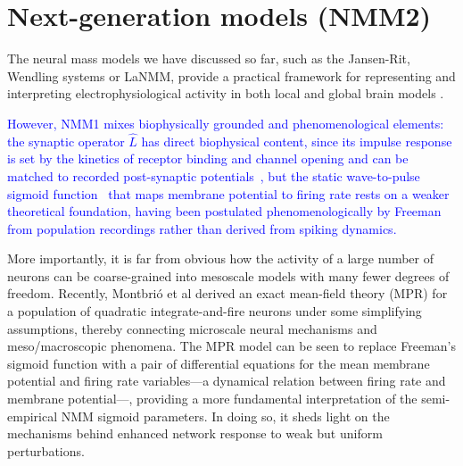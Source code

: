 \documentclass[12pt]{article}
\numberwithin{equation}{section}
\newcommand{\rev}[1]{\textcolor{blue}{#1}}
\begin{document}
 




 
\section{Next-generation models (NMM2)} \label{sec:NMM2}
\begin{tcolorbox}[colback=gray!6,colframe=gray!6,enlarge left by=0mm, boxrule=0pt, enhanced, sharp corners]
The neural mass models we have discussed so far, such as the Jansen-Rit, Wendling systems or LaNMM, provide a practical framework for representing and interpreting electrophysiological activity in both local and global brain models \cite{wilson_excitatory_1972,lopes_da_silva_model_1974,lopes_da_silva_model_1976,jansen_neurophysiologically-based_1993,jansen_electroencephalogram_1995,wendling_epileptic_2002,Ruffini:2018aa, sanchez-todo_personalization_2018, Ruffini2020P118,sanchez-todoTH230MechanisticUnderstanding2022,sanchez-todoFastInterneuronDysfunction2025,cabralMetastableOscillatoryModes2022,deco_awakening_2019}.  
 
 \rev{However, NMM1 mixes biophysically grounded and phenomenological elements: the synaptic operator $\hat L$ has direct biophysical content, since its impulse response is set by the kinetics of receptor binding and channel opening and can be matched to recorded post-synaptic potentials~\cite{Destexhe:1998aa, Pods:2013aa, Ermentrout:2010aa}, but the static wave-to-pulse sigmoid function~\cite{Freeman:1975aa,Kay:2018aa, Eeckman:1991aa} that maps membrane potential to firing rate rests on a weaker theoretical foundation, having been postulated phenomenologically by Freeman from population recordings rather than derived from spiking dynamics.}
 
 More importantly, it is far from obvious how the activity of a large number of neurons can be coarse-grained into mesoscale models with many fewer degrees of freedom.
   Recently, Montbri\'o et al \cite{Montbrio:2015aa} derived an exact mean-field theory (MPR)  for a population of quadratic integrate-and-fire neurons under some simplifying assumptions, thereby connecting microscale neural mechanisms and meso/macroscopic phenomena. 
 The MPR model can be seen to replace Freeman's sigmoid function with a pair of differential equations for the mean membrane potential and firing rate variables---a dynamical relation between firing rate and membrane potential---, providing a more fundamental interpretation of the semi-empirical NMM sigmoid parameters. In doing so,  it sheds light on the mechanisms behind enhanced network response to weak but uniform perturbations. 
 

\end{tcolorbox}
\end{document}

